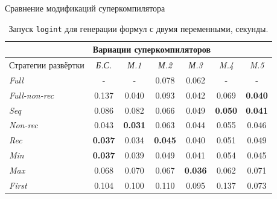 \documentclass[xcolor=table]{beamer}
\begin{document}
\begin{frame}{Сравнение модификаций суперкомпилятора}
\begin{table}[h!]
\center
\begin{tabular}{|p{2.3cm}||c|c|c|c|c|c|}
\hline
                 & \multicolumn{6}{|l|}{Вариации суперкомпиляторов} \\ \hline
Стратегии развёртки &{\it Б.С.}&{\it М.1}&{\it М.2}&{\it М.3}&{\it M.4}&{\it M.5} \\ \hline \hline
{\it Full        }&    -        &    -        & 0.078       & 0.062      &    -        & - \\ \hline
{\it Full-non-rec}& 0.137       & 0.040       & 0.093       & 0.042      & 0.069       & {\bf 0.040} \\ \hline
{\it Seq         }& 0.086       & 0.082       & 0.066       & 0.049      & {\bf 0.050} & {\bf 0.041} \\ \hline
{\it Non-rec     }& 0.043       & {\bf 0.031} & 0.063       & 0.044      & 0.055       & 0.046 \\ \hline
{\it Rec         }& {\bf 0.037} & 0.034       & {\bf 0.045} & 0.040      & 0.051       & 0.049 \\ \hline
{\it Min         }& {\bf 0.037} & 0.039       & 0.049       & 0.041      & 0.054       & 0.045 \\ \hline
{\it Max         }& 0.068       & 0.070       & 0.067       &{\bf 0.036} & 0.062       & 0.071 \\ \hline
{\it First       }& 0.104       & 0.100       & 0.110       & 0.095      & 0.137       & 0.073 \\ \hline
\end{tabular}
\caption{Запуск \lstinline{logint} для генерации формул с двумя переменными, секунды.}
\label{fig:logintTest3}
\end{table}
\end{frame}
\end{document}
